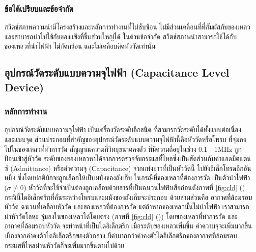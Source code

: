 \documentclass[final,11pt,a4paper]{article}
\begin{document}
\subsubsection{ข้อได้เปรียบและข้อจำกัด}
สวิตช์สภาพความนำมีโครงสร้างและหลักการทำงานที่ไม่ซับซ้อน ไม่มีส่วนเคลื่อนที่ที่สัมผัสกับของเหลว และสามารถนำไปใช้กับของแข็งที่ชื้นส่วนใหญ่ได้ 
ในด้านข้อจำกัด สวิตช์สภาพนำสามารถใช้ได้กับของเหลวที่นำไฟฟ้า ไม่กัดกร่อน และไม่เคลือบติดหัววัดเท่านั้น

\subsection{อุปกรณ์วัดระดับแบบความจุไฟฟ้า (Capacitance Level Device)}
\subsubsection{หลักการทำงาน} 
อุปกรณ์วัดระดับแบบความจุไฟฟ้า เป็นเครื่องวัดระดับอีกชนิด ที่สามารถวัดระดับได้ทั้งแบบต่อเนื่อง และแบบจุด 
ส่วนประกอบที่สำคัญของอุปกรณ์วัดระดับแบบความจุไฟฟ้านี้คือหัววัดหรือโพรบ ที่จุ่มลงไปในของเหลวที่ทำการวัด สัญญาณความถี่วิทยุขนาดคงตัว
ที่มีความถี่อยู่ในช่วง 0.1 - 1MHz ถูกป้อนเข้าสู่หัววัด ระดับของของเหลวหาได้จากการตรวจจับกระแสที่ไหลซึ่งเป็นสัดส่วนกับค่าแอดมิตแตนซ์ (Admittance) 
หรือค่าความจุ (Capacitance) จากแท่งยาวที่เป็นหัววัดนี้ ไปยังอิเล็กโทรดอีกอันหนึ่ง ซึ่งโดยปกติมักจะถูกเลือกให้เป็นผนังของถังเก็บ ในกรณีที่ของเหลวที่ต้องการวัด
เป็นตัวนำไฟฟ้า ($\sigma \neq 0$) หัววัดที่จะใช้จำเป็นต้องถูกเคลือบด้วยสารที่เป็นฉนวนไฟฟ้าเสียก่อนดังภาพที่ \ref{fig:cld} ()  กรณีนี้ไดอิเล็กตริกที่คั่นระหว่างโพรบและผนังของถังเก็บจะประกอบ
ด้วยสามส่วนคือ อากาศที่ล้อมรอบหัววัด ฉนวนที่เคลือบหัววัด และของเหลวที่ต้องการวัด แต่ถ้าหากของเหลวนั้นไม่นำไฟฟ้า เราสามารถนำหัววัดโลหะ
จุ่มลงในของเหลวได้โดยตรง (ภาพที่ \ref{fig:cld} ()) โดยของเหลวที่ทำการวัด และอากาศที่ล้อมรอบหัววัด จะทำหน้าที่เป็นไดอิเล็กตริก เมื่อระดับของเหลวเพิ่มขึ้น 
ค่าความจุจะเพิ่มมากขึ้น เนื่องจากค่าคงตัวไดอิเล็กตริกของตัวกลาง มีค่ามากกว่าค่าคงตัวไดอิเล็กตริกของอากาศที่ล้อมรอบ กระแสที่ไหลผ่านหัววัดก็จะเพิ่มมากขึ้นตามไปด้วย
\end{document}

